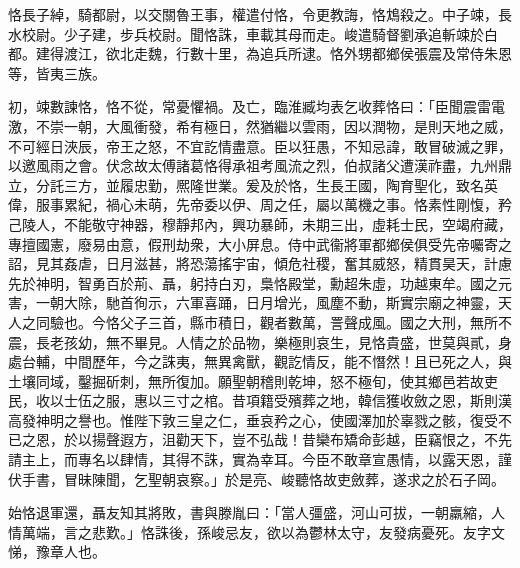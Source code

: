 \begin{pinyinscope}
 
 
 
 恪長子綽，騎都尉，以交關魯王事，權遣付恪，令更教誨，恪鴆殺之。中子竦，長水校尉。少子建，步兵校尉。聞恪誅，車載其母而走。峻遣騎督劉承追斬竦於白都。建得渡江，欲北走魏，行數十里，為追兵所逮。恪外甥都鄉侯張震及常侍朱恩等，皆夷三族。
 
 
初，竦數諫恪，恪不從，常憂懼禍。及亡，臨淮臧均表乞收葬恪曰：「臣聞震雷電激，不崇一朝，大風衝發，希有極日，然猶繼以雲雨，因以潤物，是則天地之威，不可經日浹辰，帝王之怒，不宜訖情盡意。臣以狂愚，不知忌諱，敢冒破滅之罪，以邀風雨之會。伏念故太傅諸葛恪得承祖考風流之烈，伯叔諸父遭漢祚盡，九州鼎立，分託三方，並履忠勤，熈隆世業。爰及於恪，生長王國，陶育聖化，致名英偉，服事累紀，禍心未萌，先帝委以伊、周之任，屬以萬機之事。恪素性剛愎，矜己陵人，不能敬守神器，穆靜邦內，興功暴師，未期三出，虛耗士民，空竭府藏，專擅國憲，廢易由意，假刑劫衆，大小屏息。侍中武衞將軍都鄉侯俱受先帝囑寄之詔，見其姦虐，日月滋甚，將恐蕩搖宇宙，傾危社稷，奮其威怒，精貫昊天，計慮先於神明，智勇百於荊、聶，躬持白刃，梟恪殿堂，勳超朱虛，功越東牟。國之元害，一朝大除，馳首徇示，六軍喜踊，日月增光，風塵不動，斯實宗廟之神靈，天人之同驗也。今恪父子三首，縣市積日，觀者數萬，詈聲成風。國之大刑，無所不震，長老孩幼，無不畢見。人情之於品物，樂極則哀生，見恪貴盛，世莫與貳，身處台輔，中間歷年，今之誅夷，無異禽獸，觀訖情反，能不憯然！且已死之人，與土壤同域，鑿掘斫刺，無所復加。願聖朝稽則乾坤，怒不極旬，使其鄉邑若故吏民，收以士伍之服，惠以三寸之棺。昔項籍受殯葬之地，韓信獲收斂之恩，斯則漢高發神明之譽也。惟陛下敦三皇之仁，垂哀矜之心，使國澤加於辜戮之骸，復受不已之恩，於以揚聲遐方，沮勸天下，豈不弘哉！昔欒布矯命彭越，臣竊恨之，不先請主上，而專名以肆情，其得不誅，實為幸耳。今臣不敢章宣愚情，以露天恩，謹伏手書，冒昧陳聞，乞聖朝哀察。」於是亮、峻聽恪故吏斂葬，遂求之於石子岡。
 
 
始恪退軍還，聶友知其將敗，書與滕胤曰：「當人彊盛，河山可拔，一朝羸縮，人情萬端，言之悲歎。」恪誅後，孫峻忌友，欲以為鬱林太守，友發病憂死。友字文悌，豫章人也。
 
 
\end{pinyinscope}